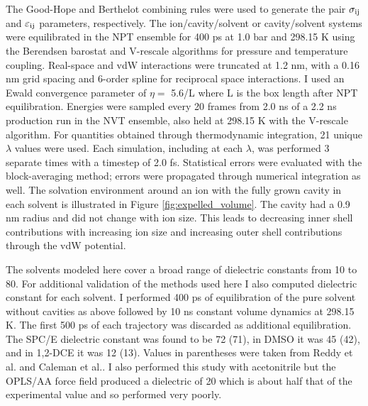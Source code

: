 \begin{tatb}
   The Good-Hope\cite{goodhope} and Berthelot\cite{berthelot} combining rules were used to generate the pair $\sigma_{\mathrm{ij}}$ and $\varepsilon_{\mathrm{ij}}$ parameters, 
   respectively. The ion/cavity/solvent or cavity/solvent systems were equilibrated in the NPT ensemble for 400 ps at 1.0 bar and 298.15 K using the Berendsen 
   barostat\cite{barostat} and V-rescale algorithms\cite{vrescale} for pressure and temperature coupling. Real-space and vdW interactions were truncated at 1.2 nm,
   with a 0.16 nm grid spacing and 6-order spline for reciprocal space interactions. I used an Ewald convergence parameter of $\eta =$ 5.6/L where L is the box
   length after NPT equilibration. Energies were sampled every 20 frames from 2.0 ns of a 2.2 ns production run in the NVT ensemble, also held at 298.15 K with the
   V-rescale algorithm\cite{vrescale}. For quantities obtained through thermodynamic integration, 21 unique $\lambda$ values were used. Each simulation, including at 
   each $\lambda$, was performed 3 separate times with a timestep of 2.0 fs. Statistical errors were evaluated with the block-averaging method; errors were propagated
   through numerical integration as well. The solvation environment around an ion with the fully grown cavity in each solvent is illustrated in Figure
   \ref{fig:expelled_volume}. The cavity had a 0.9 nm radius and did not change with ion size. This leads to decreasing inner shell contributions with increasing 
   ion size and increasing outer shell contributions through the vdW potential.

   The solvents modeled here cover a broad range of dielectric constants from 10 to 80. For additional validation of the methods used here I also computed dielectric
   constant for each solvent. I performed 400 ps of equilibration of the pure solvent without cavities as above followed by 10 ns constant volume dynamics at 298.15 K.
   The first 500 ps of each trajectory was discarded as additional equilibration. The SPC/E dielectric constant was found to be 72 (71), in DMSO it was 45 (42), and in
   1,2-DCE it was 12 (13). Values in parentheses were taken from Reddy et al.\cite{reddy1989dielectric} and Caleman et al.\cite{caleman2011force}. I also performed
   this study with acetonitrile but the OPLS/AA force field produced a dielectric of 20 which is about half that of the experimental value and so performed very
   poorly\cite{caleman2011force}.


\end{tatb}
